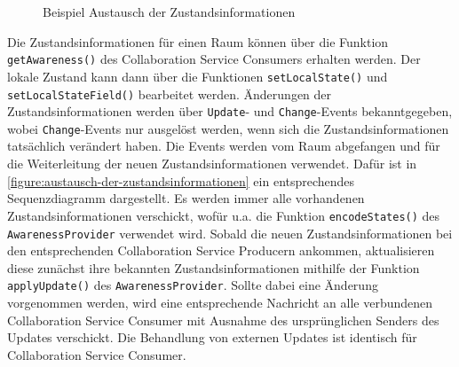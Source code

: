 \begin{figure}[tbp]
    \centering

    \caption{Beispiel Austausch der Zustandsinformationen}
    \label{figure:austausch-der-zustandsinformationen}
\end{figure}

Die Zustandsinformationen für einen Raum können über die Funktion \texttt{getAwareness()} des Collaboration Service Consumers erhalten werden. Der lokale Zustand kann dann über die Funktionen \texttt{setLocalState()} und \texttt{setLocalStateField()} bearbeitet werden. Änderungen der Zustandsinformationen werden über \texttt{Update}- und \texttt{Change}-Events bekanntgegeben, wobei \texttt{Change}-Events nur ausgelöst werden, wenn sich die Zustandsinformationen tatsächlich verändert haben. Die Events werden vom Raum abgefangen und für die Weiterleitung der neuen Zustandsinformationen verwendet. Dafür ist in \autoref{figure:austausch-der-zustandsinformationen} ein entsprechendes Sequenzdiagramm dargestellt. Es werden immer alle vorhandenen Zustandsinformationen verschickt, wofür u.a. die Funktion \texttt{encodeStates()} des \texttt{AwarenessProvider} verwendet wird. Sobald die neuen Zustandsinformationen bei den entsprechenden Collaboration Service Producern ankommen, aktualisieren diese zunächst ihre bekannten Zustandsinformationen mithilfe der Funktion \texttt{applyUpdate()} des \texttt{AwarenessProvider}. Sollte dabei eine Änderung vorgenommen werden, wird eine entsprechende Nachricht an alle verbundenen Collaboration Service Consumer mit Ausnahme des ursprünglichen Senders des Updates verschickt. Die Behandlung von externen Updates ist identisch für Collaboration Service Consumer.

